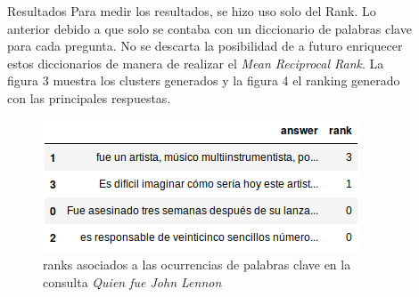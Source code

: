 \documentclass[final]{beamer}
\newlength{\sepwid}
\newlength{\onecolwid}
\newlength{\twocolwid}
\begin{document}
\begin{frame}[t]
\begin{columns}[t]
\begin{column}{\twocolwid}
\begin{columns}[t,totalwidth=\twocolwid] %

\begin{column}{\onecolwid} %





\end{column} %

\begin{column}{\onecolwid} %




\end{column} %

\end{columns} %

\end{column} %

\begin{column}{\sepwid}\end{column} %

\begin{column}{\onecolwid} %

\begin{block}{Resultados}
Para medir los resultados, se hizo uso solo del Rank. Lo anterior debido a que solo se contaba con un diccionario de palabras clave para cada pregunta. No se descarta la posibilidad de a futuro enriquecer estos diccionarios de manera de realizar el \textit{Mean Reciprocal Rank}. La figura 3 muestra los clusters generados y la figura 4 el ranking generado con las principales respuestas.
\begin{figure}
\centering
\includegraphics[scale=1.7]{img/rank.png} 
\caption{ranks asociados a las ocurrencias de palabras clave en la consulta \textit{Quien fue John Lennon}}
\end{figure}
\end{block}



\end{column}
\end{columns}
\end{frame}
\end{document}
